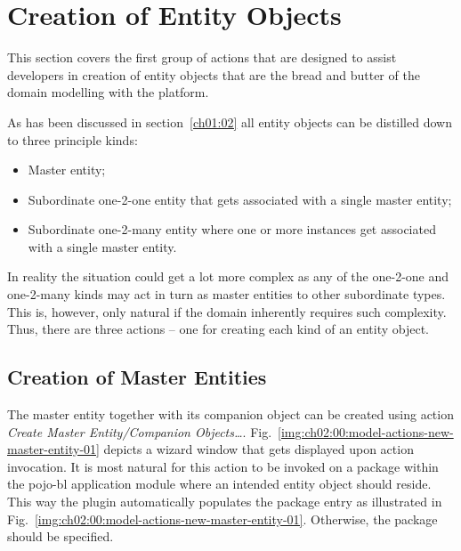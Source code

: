 \section{Creation of Entity Objects}
  
  This section covers the first group of actions that are designed to assist developers in creation of entity objects that are the bread and butter of the domain modelling with the platform.

  As has been discussed in section~\ref{ch01:02} all entity objects can be distilled down to three principle kinds:
  
  \begin{itemize}
   \item Master entity;
   \item Subordinate one-2-one entity that gets associated with a single master entity;
   \item Subordinate one-2-many entity where one or more instances get associated with a single master entity.
  \end{itemize}

  In reality the situation could get a lot more complex as any of the one-2-one and one-2-many kinds may act in turn as master entities to other subordinate types. 
  This is, however, only natural if the domain inherently requires such complexity.  
  Thus, there are three actions -- one for creating each kind of an entity object.
  
  \subsection{Creation of Master Entities}
  
  The master entity together with its companion object can be created using action \emph{Create Master Entity/Companion Objects\ldots}.
  Fig.~\ref{img:ch02:00:model-actions-new-master-entity-01} depicts a wizard window that gets displayed upon action invocation.
  It is most natural for this action to be invoked on a package within the pojo-bl application module where an intended entity object should reside.
  This way the plugin automatically populates the package entry as illustrated in Fig.~\ref{img:ch02:00:model-actions-new-master-entity-01}.
  Otherwise, the package should be specified.

